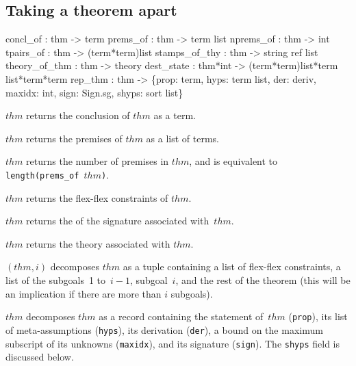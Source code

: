 \subsection{Taking a theorem apart}
\begin{ttbox} 
concl_of      : thm -> term
prems_of      : thm -> term list
nprems_of     : thm -> int
tpairs_of     : thm -> (term*term)list
stamps_of_thy : thm -> string ref list
theory_of_thm : thm -> theory
dest_state    : thm*int -> (term*term)list*term list*term*term
rep_thm       : thm -> \{prop: term, hyps: term list, der: deriv, 
                        maxidx: int, sign: Sign.sg, shyps: sort list\}
\end{ttbox}
\begin{ttdescription}
\item[\ttindexbold{concl_of} $thm$] 
returns the conclusion of $thm$ as a term.

\item[\ttindexbold{prems_of} $thm$] 
returns the premises of $thm$ as a list of terms.

\item[\ttindexbold{nprems_of} $thm$] 
returns the number of premises in $thm$, and is equivalent to {\tt
  length(prems_of~$thm$)}.

\item[\ttindexbold{tpairs_of} $thm$] 
returns the flex-flex constraints of $thm$.

\item[\ttindexbold{stamps_of_thm} $thm$] 
returns the  of the signature associated with~$thm$.

\item[\ttindexbold{theory_of_thm} $thm$]
returns the theory associated with $thm$.

\item[\ttindexbold{dest_state} $(thm,i)$] 
decomposes $thm$ as a tuple containing a list of flex-flex constraints, a
list of the subgoals~1 to~$i-1$, subgoal~$i$, and the rest of the theorem
(this will be an implication if there are more than $i$ subgoals).

\item[\ttindexbold{rep_thm} $thm$] decomposes $thm$ as a record containing the
  statement of~$thm$ ({\tt prop}), its list of meta-assumptions ({\tt hyps}),
  its derivation ({\tt der}), a bound on the maximum subscript of its
  unknowns ({\tt maxidx}), and its signature ({\tt sign}).  The {\tt shyps}
  field is discussed below.
\end{ttdescription}


